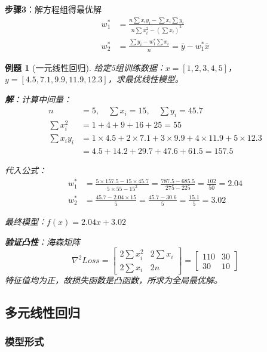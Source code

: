 \documentclass[12pt,a4paper]{ctexart}
\newtheorem{exercise}{例题}[section]
\begin{document}
\textbf{步骤3}：解方程组得最优解
\begin{align}
w_1^* &= \frac{n\sum x_iy_i - \sum x_i \sum y_i}{n\sum x_i^2 - (\sum x_i)^2} \\
w_2^* &= \frac{\sum y_i - w_1^*\sum x_i}{n} = \bar{y} - w_1^*\bar{x}
\end{align}

\begin{exercise}[一元线性回归]
给定5组训练数据：$x = [1, 2, 3, 4, 5]$，$y = [4.5, 7.1, 9.9, 11.9, 12.3]$，求最优线性模型。

\textbf{解}：计算中间量：
\begin{align*}
n &= 5, \quad \sum x_i = 15, \quad \sum y_i = 45.7 \\
\sum x_i^2 &= 1 + 4 + 9 + 16 + 25 = 55 \\
\sum x_iy_i &= 1 \times 4.5 + 2 \times 7.1 + 3 \times 9.9 + 4 \times 11.9 + 5 \times 12.3 \\
&= 4.5 + 14.2 + 29.7 + 47.6 + 61.5 = 157.5
\end{align*}

代入公式：
\begin{align*}
w_1^* &= \frac{5 \times 157.5 - 15 \times 45.7}{5 \times 55 - 15^2} = \frac{787.5 - 685.5}{275 - 225} = \frac{102}{50} = 2.04 \\
w_2^* &= \frac{45.7 - 2.04 \times 15}{5} = \frac{45.7 - 30.6}{5} = \frac{15.1}{5} = 3.02
\end{align*}

最终模型：$\boxed{f(x) = 2.04x + 3.02}$

\textbf{验证凸性}：海森矩阵
\[
\nabla^2 Loss = \begin{bmatrix} 2\sum x_i^2 & 2\sum x_i \\ 2\sum x_i & 2n \end{bmatrix} = \begin{bmatrix} 110 & 30 \\ 30 & 10 \end{bmatrix}
\]
特征值均为正，故损失函数是凸函数，所求为全局最优解。
\end{exercise}

\subsection{多元线性回归}

\subsubsection{模型形式}
\end{document}
